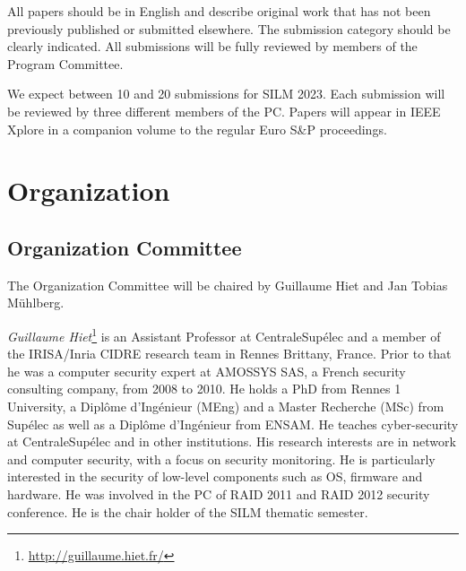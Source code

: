 \documentclass[a4paper,11pt]{article} %
\numberwithin{equation}{section} %
\numberwithin{figure}{section} %
\numberwithin{table}{section} %
\newcommand{\SILMYear}{2023}
\begin{document}
All papers should be in English and describe original work that has not
been previously published or submitted elsewhere. The submission category
should be clearly indicated. All submissions will be fully reviewed by
members of the Program Committee.

We expect between 10 and 20 submissions for SILM \SILMYear{}. Each submission will
be reviewed by three different members of the PC.
Papers will appear in IEEE Xplore in a companion volume to the regular Euro
S\&P proceedings.


\section{Organization}

\subsection{Organization Committee}

The Organization Committee will be chaired by Guillaume Hiet and Jan Tobias
M\"uhlberg.

\emph{Guillaume Hiet}\footnote{\url{http://guillaume.hiet.fr/}} is an
Assistant Professor at CentraleSupélec and a member of the IRISA/Inria
CIDRE research team in Rennes Brittany, France. Prior to that he was a
computer security expert at AMOSSYS SAS, a French security consulting
company, from 2008 to 2010. He holds a PhD from Rennes 1 University, a
Diplôme d'Ingénieur (MEng) and a Master Recherche (MSc) from Supélec as
well as a Diplôme d'Ingénieur from ENSAM. He teaches cyber-security at
CentraleSupélec and in other institutions. His research interests are in
network and computer security, with a focus on security monitoring. He is
particularly interested in the security of low-level components such as OS,
firmware and hardware. He was involved in the PC of RAID 2011 and RAID 2012
security conference. He is the chair holder of the SILM thematic semester.
\end{document}
